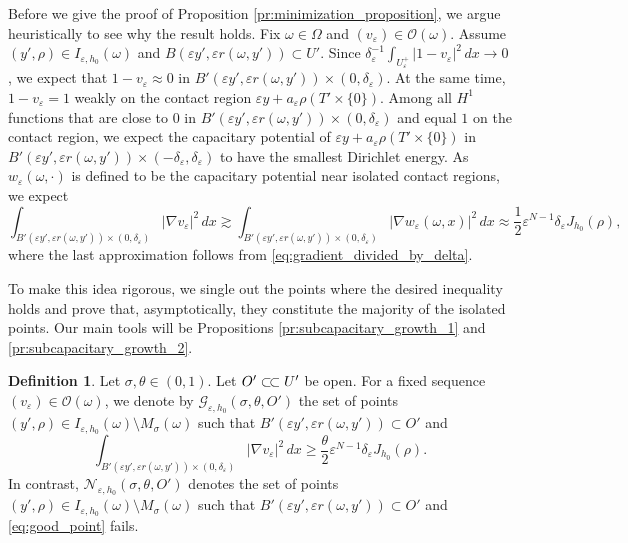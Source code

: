 \documentclass{article}
\numberwithin{equation}{section}
\theoremstyle{definition}
\newtheorem{definition}[theorem]{Definition}
\theoremstyle{remark}
\newcommand{\csubset}{\subset\joinrel\subset}
\begin{document}
Before we give the proof of Proposition \ref{pr:minimization_proposition}, we argue heuristically to see why the result holds. Fix $\omega \in \Omega$ and $(v_\varepsilon) \in \mathcal{O}(\omega)$. Assume $(y', \rho) \in I_{\varepsilon, h_0}(\omega)$ and $B(\varepsilon y', \varepsilon r(\omega, y')) \subset U'$. Since $\delta_\varepsilon^{-1} \int_{U_\varepsilon^+} |1 - v_\varepsilon|^2 \, dx \to 0$, we expect that $1 - v_\varepsilon \approx 0$ in $B'(\varepsilon y', \varepsilon r(\omega, y')) \times (0, \delta_\varepsilon)$. At the same time, $1 - v_\varepsilon = 1$ weakly on the contact region $\varepsilon y + a_\varepsilon \rho(T' \times \{0\})$. Among all $H^1$ functions that are close to $0$ in $B'(\varepsilon y', \varepsilon r(\omega, y')) \times (0, \delta_\varepsilon)$ and equal $1$ on the contact region, we expect the capacitary potential of $\varepsilon y + a_\varepsilon \rho(T' \times \{0\})$ in $B'(\varepsilon y', \varepsilon r(\omega, y')) \times (-\delta_\varepsilon, \delta_\varepsilon)$ to have the smallest Dirichlet energy. As $w_\varepsilon(\omega, \cdot)$ is defined to be the capacitary potential near isolated contact regions, we expect
\[
\int_{B'(\varepsilon y', \varepsilon r(\omega, y')) \times (0, \delta_\varepsilon)} |\nabla v_\varepsilon|^2 \, dx \gtrsim \int_{B'(\varepsilon y', \varepsilon r(\omega, y')) \times (0, \delta_\varepsilon)} |\nabla w_\varepsilon(\omega, x)|^2 \, dx \approx \frac{1}{2} \varepsilon^{N - 1} \delta_\varepsilon J_{h_0}(\rho),
\]
where the last approximation follows from \eqref{eq:gradient_divided_by_delta}.

To make this idea rigorous, we single out the points where the desired inequality holds and prove that, asymptotically, they constitute the majority of the isolated points. Our main tools will be Propositions \ref{pr:subcapacitary_growth_1} and \ref{pr:subcapacitary_growth_2}.

\begin{definition}
    Let $\sigma, \theta \in (0, 1)$. Let $O' \csubset U'$ be open.  For a fixed sequence $(v_\varepsilon) \in \mathcal{O}(\omega)$, we denote by $\mathcal{G}_{\varepsilon, h_0}(\sigma, \theta, O')$ the set of points $(y', \rho) \in I_{\varepsilon, h_0}(\omega) \setminus M_\sigma(\omega)$ such that $B'(\varepsilon y', \varepsilon r(\omega, y')) \subset O'$ and
    \begin{equation} \label{eq:good_point}
        \int_{B'(\varepsilon y', \varepsilon r(\omega, y')) \times (0, \delta_\varepsilon)} |\nabla v_\varepsilon|^2 \, dx \ge \frac{\theta}{2} \varepsilon^{N - 1} \delta_\varepsilon J_{h_0}(\rho).
    \end{equation}
    In contrast, $\mathcal{N}_{\varepsilon, h_0}(\sigma, \theta, O')$ denotes the set of points $(y', \rho) \in I_{\varepsilon, h_0}(\omega) \setminus M_\sigma(\omega)$ such that $B'(\varepsilon y', \varepsilon r(\omega, y')) \subset O'$ and \eqref{eq:good_point} fails.
\end{definition}
\end{document}
